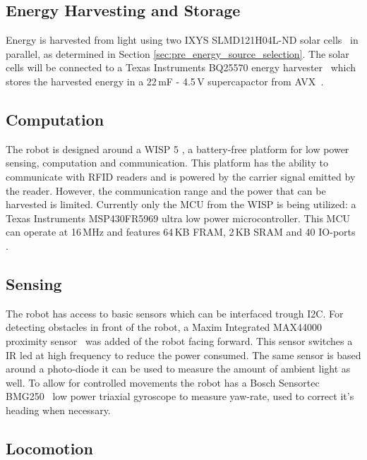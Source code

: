 \subsection{Energy Harvesting and Storage}
Energy is harvested from light using two IXYS SLMD121H04L-ND solar cells~\cite{ixolar_slmd121h04l_2017} in parallel, as determined in Section \ref{sec:pre_energy_source_selection}.
The solar cells will be connected to a Texas Instruments BQ25570 energy harvester~\cite{bq25570_2017} which stores the harvested energy in a 22\,mF - 4.5\,V supercapactor from AVX~\cite{avx_bestcap_2017}.

\subsection{Computation}
\label{sec:dai_computation}

The robot is designed around a WISP 5 \cite{wisp5_wiki_2017}, a battery-free platform for low power sensing, computation and communication.
This platform has the ability to communicate with RFID readers and is powered by the carrier signal emitted by the reader.
However, the communication range and the power that can be harvested is limited.
Currently only the MCU from the WISP is being utilized: a Texas Instruments MSP430FR5969 ultra low power microcontroller.
This MCU can operate at 16\,MHz and features 64\,KB FRAM, 2\,KB SRAM and 40 IO-ports \cite{msp430fr5969_2017}.

\subsection{Sensing}
\label{sec:dai_sensing}

The robot has access to basic sensors which can be interfaced trough I2C.
For detecting obstacles in front of the robot, a Maxim Integrated MAX44000 proximity sensor~\cite{max44000_2017} was added of the robot facing forward.
This sensor switches a IR led at high frequency to reduce the power consumed.
The same sensor is based around a photo-diode it can be used to measure the amount of ambient light as well.
To allow for controlled movements the robot has a Bosch Sensortec BMG250~\cite{bosch_bmg250_2017} low power triaxial gyroscope to measure yaw-rate, used to correct it's heading when necessary.

\subsection{Locomotion}


